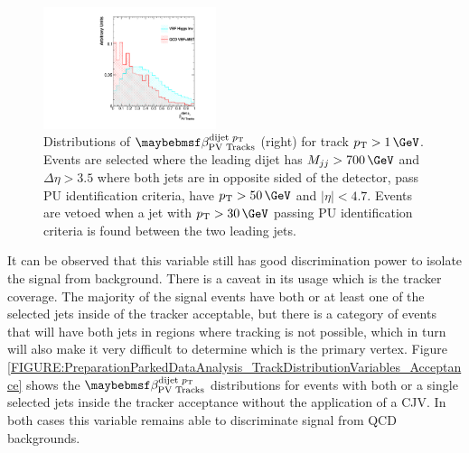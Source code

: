 \begin{figure}[!htb]
\centering
\includegraphics[width=0.45\textwidth]{Chapter06/TrackVariables/Images/Tracks1_CJVPass_TracksERation.pdf}
\caption{Distributions of $\beta_{\text{PV Tracks}}^{\text{dijet }\pt}$ (right) for track $\pt>1\,\GeV$. Events are selected where the leading dijet has $M_{jj}>700\,\GeV$ and $\Delta\eta>3.5$ where both jets are in opposite sided of the detector, pass \gls{PU} identification criteria, have $\pt>50\,\GeV$ and $|\eta|<4.7$. Events are vetoed when a jet with  $\pt>30\,\GeV$ passing \gls{PU} identification criteria is found between the two leading jets.}
\label{FIGURE:PreparationParkedDataAnalysis_TrackDistributionVariables_SelectionCJV}
\end{figure}

It can be observed that this variable still has good discrimination power to isolate the signal from background. There is a caveat in its usage which is the tracker coverage. The majority of the signal events have both or at least one of the selected jets inside of the tracker acceptable, but there is a category of events that will have both jets in regions where tracking is not possible, which in turn will also make it very difficult to determine which is the primary vertex. Figure \ref{FIGURE:PreparationParkedDataAnalysis_TrackDistributionVariables_Acceptance} shows the $\beta_{\text{PV Tracks}}^{\text{dijet }\pt}$ distributions for events with both or a single selected jets inside the tracker acceptance without the application of a \gls{CJV}. In both cases this variable remains able to discriminate signal from \gls{QCD} backgrounds. 

